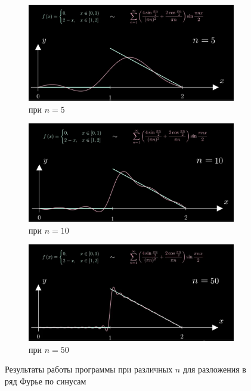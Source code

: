 \documentclass[a5paper, 10pt]{article}
\theoremstyle{definition}
\theoremstyle{plain}
\theoremstyle{remark}
\begin{document}
\begin{figure}
		\begin{center}
			\begin{subfigure}{0.7\linewidth}
				\includegraphics[width=\linewidth]{"./pictures/s_5.png"}
				\caption{при $n=5$}
			\end{subfigure}
			\begin{subfigure}{0.7\linewidth}
				\includegraphics[width=\linewidth]{"./pictures/s_10.png"}
				\caption{при $n=10$}
			\end{subfigure}
			\begin{subfigure}{0.7\linewidth}
				\includegraphics[width=\linewidth]{"./pictures/s_50.png"}
				\caption{при $n=50$}
			\end{subfigure}
		\caption{Результаты работы программы при различных $n$ для разложения в ряд Фурье по синусам}\label{result}
		\end{center}
	\end{figure}
\end{document}
